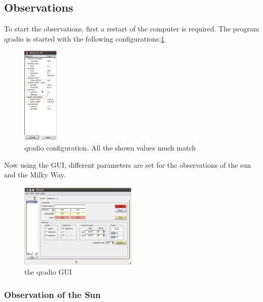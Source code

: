 \documentclass[12pt,a4paper]{article}
\begin{document}
    \subsection{Observations}
            To start the observations, first a restart of the computer is required. The program qradio is started with the following configurations:\ref{fig:qradio_config}
            \begin{figure}[H]
                \centering
                \includegraphics[width=0.15\textwidth]{qradio_config.png}
                \caption{qradio configuration. All the shown values much match}
                \label{fig:qradio_config}
            \end{figure} 

            Now using the GUI, different parameters are set for the observations of the sun and the Milky Way.

            \begin{figure}[H]
                \centering
                \includegraphics[width=0.5\textwidth]{qradio_gui.png}
                \caption{the qradio GUI}
                \label{fig:qradio_gui}
            \end{figure}
        \subsubsection{Observation of the Sun}
\end{document}
